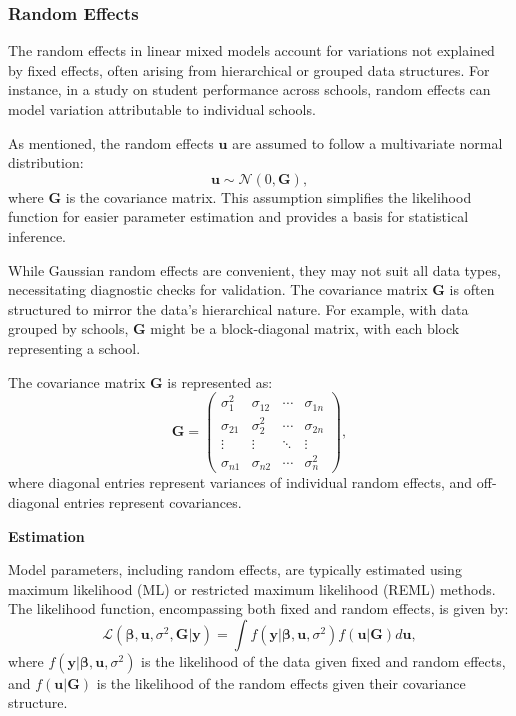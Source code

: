 \documentclass[12pt, twoside,hidelinks]{article}
\theoremstyle{definition}
\numberwithin{equation}{section}
\begin{document}
\subsubsection{Random Effects}

The random effects in linear mixed models account for variations not explained by fixed effects, often arising from hierarchical or grouped data structures. For instance, in a study on student performance across schools, random effects can model variation attributable to individual schools.    
\newline

As mentioned, the random effects $\boldsymbol{u}$ are assumed to follow a multivariate normal distribution:
\begin{equation}
\boldsymbol{u} \sim \mathcal{N}(0, \mathbf{G}),
\label{eq:random_effects_distribution}
\end{equation}
where $\mathbf{G}$ is the covariance matrix. This assumption simplifies the likelihood function for easier parameter estimation and provides a basis for statistical inference.
\newline

While Gaussian random effects are convenient, they may not suit all data types, necessitating diagnostic checks for validation. The covariance matrix $\mathbf{G}$ is often structured to mirror the data's hierarchical nature. For example, with data grouped by schools, $\mathbf{G}$ might be a block-diagonal matrix, with each block representing a school.

The covariance matrix $\mathbf{G}$ is represented as:
\begin{equation}
\mathbf{G} = \begin{pmatrix}
\sigma^2_1 & \sigma_{12} & \cdots & \sigma_{1n} \\
\sigma_{21} & \sigma^2_2 & \cdots & \sigma_{2n} \\
\vdots & \vdots & \ddots & \vdots \\
\sigma_{n1} & \sigma_{n2} & \cdots & \sigma^2_n
\end{pmatrix},
\label{eq:covariance_matrix}
\end{equation}
where diagonal entries represent variances of individual random effects, and off-diagonal entries represent covariances.
\newline

\textbf{Estimation}

Model parameters, including random effects, are typically estimated using maximum likelihood (ML) or restricted maximum likelihood (REML) methods. The likelihood function, encompassing both fixed and random effects, is given by:
\begin{equation}
\mathcal{L}(\boldsymbol{\beta}, \boldsymbol{u}, \sigma^2, \mathbf{G} | \mathbf{y}) = \int f(\mathbf{y} | \boldsymbol{\beta}, \boldsymbol{u}, \sigma^2) f(\boldsymbol{u} | \mathbf{G}) d\boldsymbol{u},
\label{eq:likelihood_function_random_effects}
\end{equation}
where $f(\mathbf{y} | \boldsymbol{\beta}, \boldsymbol{u}, \sigma^2)$ is the likelihood of the data given fixed and random effects, and $f(\boldsymbol{u} | \mathbf{G})$ is the likelihood of the random effects given their covariance structure.
\end{document}
